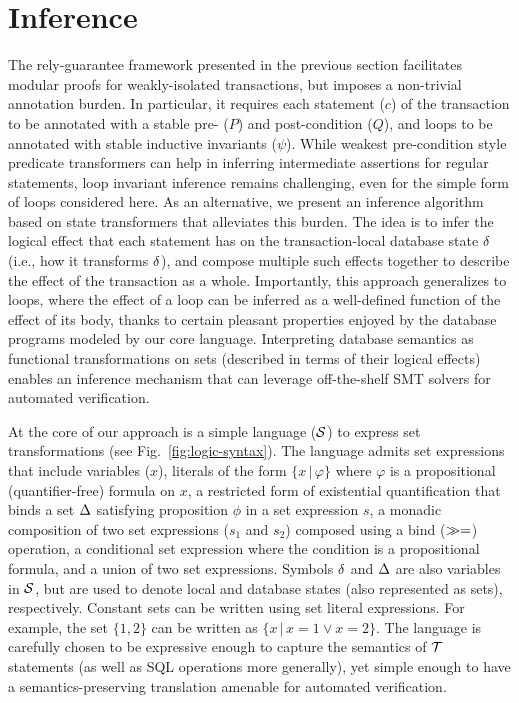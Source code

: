 \section{Inference}
\label{sec:inference}

The rely-guarantee framework presented in the previous section
facilitates modular proofs for weakly-isolated transactions, but
imposes a non-trivial annotation burden.  In particular, it requires
each statement ($c$) of the transaction to be annotated with a stable
pre- ($P$) and post-condition ($Q$), and loops to be annotated with
stable inductive invariants ($\psi$). While weakest pre-condition
style predicate transformers can help in inferring intermediate
assertions for regular statements, loop invariant inference remains
challenging, even for the simple form of loops considered here.  As an
alternative, we present an inference algorithm based on state
transformers that alleviates this burden.  The idea is to infer the
logical effect that each statement has on the transaction-local
database state $\delta$ (i.e., how it transforms $\delta$), and compose
multiple such effects together to describe the effect of the
transaction as a whole.  Importantly, this approach generalizes to
loops, where the effect of a loop can be inferred as a well-defined
function of the effect of its body, thanks to certain pleasant
properties enjoyed by the database programs modeled by our core
language.  Interpreting database semantics as functional
transformations on sets (described in terms of their logical effects)
enables an inference mechanism that can leverage off-the-shelf SMT
solvers for automated verification.



At the core of our approach is a simple language ($\mathcal{S}$) to express
set transformations (see Fig.~\ref{fig:logic-syntax}). The language
admits set expressions that include variables ($x$), literals of the
form $\{x \,|\, \varphi\}$ where $\varphi$ is a propositional
(quantifier-free) formula on $x$, a restricted form of existential
quantification that binds a set $\Delta$ satisfying proposition $\phi$
in a set expression $s$, a monadic composition of two set expressions
($s_1$ and $s_2$) composed using a bind ($\gg=$) operation, a
conditional set expression where the condition is a propositional
formula, and a union of two set expressions. Symbols $\delta$ and $\Delta$
are also variables in $\mathcal{S}$, but are used to denote local and database
states (also represented as sets), respectively. Constant sets can be
written using set literal expressions. For example, the set $\{1,2\}$
can be written as $\{x \,|\, x=1 \vee x=2\}$. The language is
carefully chosen to be expressive enough to capture the semantics of
$\mbox{${\mathcal T}$}$ statements (as well as SQL operations more generally), yet
simple enough to have a semantics-preserving translation amenable for
automated verification.


